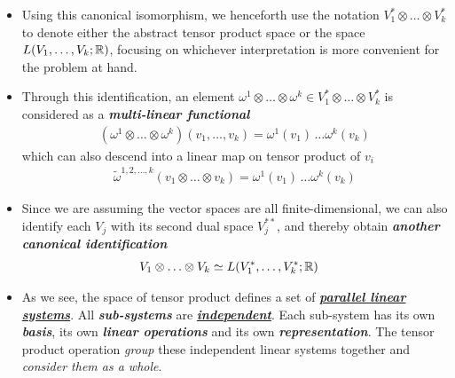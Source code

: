 \documentclass[11pt]{article}
\begin{document}
\begin{itemize}
\item \begin{remark}
Using this canonical isomorphism, we henceforth use the notation $V_1^{*}\otimes \ldots \otimes V_k^{*}$ to denote either the abstract tensor product space or the space $L(V_1,\ldots,V_k ; {\mathbb R})$, focusing on whichever interpretation is more convenient for the problem at hand.
\end{remark}

\item \begin{remark}
Through this identification, an element $\omega^{1} \otimes  \ldots \otimes \omega^{k} \in V_1^{*}\otimes \ldots \otimes V_k^{*}$ is considered as a \emph{\textbf{multi-linear functional}}
\begin{align*}
(\omega^{1} \otimes  \ldots \otimes \omega^{k})(v_1, \ldots, v_k) = \omega^{1}(v_1)\, \ldots  \omega^{k}(v_k)
\end{align*} which can also descend into a linear map on tensor product of $v_i$
\begin{align*}
\widetilde{\omega}^{1,2,\ldots, k}(v_1 \otimes \ldots \otimes v_k) = \omega^{1}(v_1)\, \ldots  \omega^{k}(v_k)
\end{align*}

\end{remark}

\item \begin{remark}
Since we are assuming the vector spaces are all finite-dimensional, we can also identify each $V_j$ with its second dual space $V_j^{**}$, and thereby obtain \emph{\textbf{another canonical identification}}
\begin{align}
V_1\otimes \ldots \otimes V_k &\simeq L(V_1^{*},\ldots,V_k^{*}; {\mathbb R}) \label{eqn: abstract_vector_tensor_product_iso}
\end{align}
\end{remark}

\item \begin{remark}
As we see, the space of tensor product defines a set of \underline{\emph{\textbf{parallel linear systems}}}. All \emph{\textbf{sub-systems}} are \underline{\emph{\textbf{independent}}}.  Each sub-system has its own \emph{\textbf{basis}}, its own \emph{\textbf{linear operations}} and its own \emph{\textbf{representation}}. The tensor product operation \emph{group} these independent linear systems together and \emph{consider them as a whole}. 


\end{remark}
\end{itemize}
\end{document}

